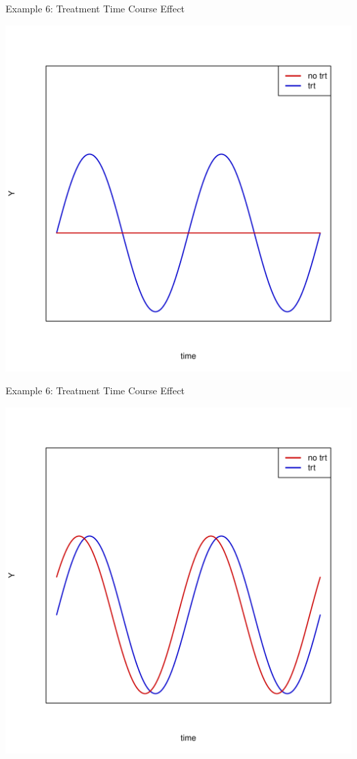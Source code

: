 \documentclass[xcolor=x11names,compress]{beamer}\usepackage[]{graphicx}\usepackage[]{color}
\newenvironment{knitrout}{}{} %
\begin{document}
\begin{frame}{Example 6: Treatment Time Course Effect}
\begin{knitrout}\tiny
{}\color{fgcolor}

{\centering \includegraphics[width=.6\linewidth]{figure/beamer-unnamed-chunk-100-1} 

}



\end{knitrout}
\end{frame}

\begin{frame}{Example 6: Treatment Time Course Effect}
\begin{knitrout}\tiny
{}\color{fgcolor}

{\centering \includegraphics[width=.6\linewidth]{figure/beamer-unnamed-chunk-101-1} 

}



\end{knitrout}
\end{frame}
\end{document}
